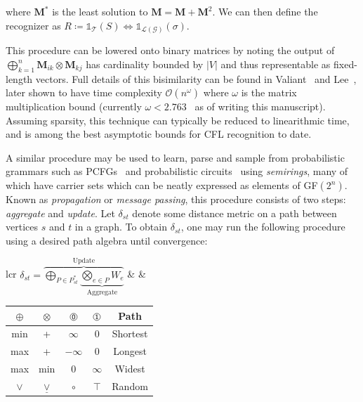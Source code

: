 \documentclass[sigplan,10pt,review,anonymous]{acmart}
\begin{document}
\noindent where $\mathbf{M}^*$ is the least solution to $\mathbf{M} = \mathbf{M} + \mathbf{M}^2$. We can then define the recognizer as $R \coloneqq \mathds{1}_{\mathcal{T}}(S) \iff \mathds{1}_{\mathcal{L}(\mathcal{G})}(\sigma)$.

This procedure can be lowered onto binary matrices by noting the output of $\bigoplus_{k = 1}^n \mathbf{M}_{ik} \otimes \mathbf{M}_{kj}$ has cardinality bounded by $|V|$ and thus representable as fixed-length vectors. Full details of this bisimilarity can be found in Valiant~\citep{valiant1975general} and Lee~\citep{lee2002fast}, later shown to have time complexity $\mathcal{O}(n^\omega)$ where $\omega$ is the matrix multiplication bound (currently $\omega < 2.763$~\citep{harris2021improved} as of writing this manuscript). Assuming sparsity, this technique can typically be reduced to linearithmic time, and is among the best asymptotic bounds for CFL recognition to date.

A similar procedure may be used to learn, parse and sample from probabilistic grammars such as PCFGs~\citep{goodman1999semiring} and probabilistic circuits~\citep{peharz2015foundations} using \textit{semirings}, many of which have carrier sets which can be neatly expressed as elements of GF$(2^n)$. Known as \textit{propagation} or \textit{message passing}, this procedure consists of two steps: \textit{aggregate} and \textit{update}. Let $\delta_{st}$ denote some distance metric on a path between vertices $s$ and $t$ in a graph. To obtain $\delta_{st}$, one may run the following procedure using a desired path algebra until convergence:\\

\vspace{-7}
  \hspace{-12}\begin{tabular}{lcr}
    $\delta_{st} = \overbrace{\underset{P\in P_{st}^*}{\bigoplus}\underbrace{\underset{e\in P}{\bigotimes}W_{e}}_{\text{Aggregate}}}^{\text{Update}}$ & &
    \bgroup
    \def\arraystretch{1.2}
    \begin{tabular}{c{1cm}c{1cm}|c{1cm}c{1cm}|c}
      $\oplus$ & $\otimes$ & $\circled{0}$ & $\circled{1}$ & Path     \\\hline
      min      & +         &   $\infty$    &      0        & Shortest \\
      max      & +         &   $-\infty$   &      0        & Longest  \\
      max      & min       &       0       &   $\infty$    & Widest   \\
      $\vee$   & $\underline{\vee}$ &  $\circ$   &  $\top$  & Random \\
    \end{tabular}
    \egroup
  \end{tabular}\\
\end{document}

